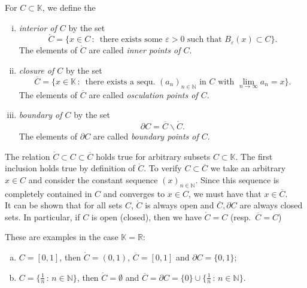 

\begin{Definition}
For $C\subset \mathbb{K}$, we define the
\begin{enumerate}[(i)]
 \item \emph{interior of $C$} by the set
\[\mathring{C}=\{x\in C\,:\,\text{ there exists some }\varepsilon>0\text{ such that }B_{\varepsilon}(x)\subset C\}.\]
The elements of $\mathring{C}$ are called \textit{inner points of $C$}.
 \item \emph{closure of $C$} by the set
   \[\overline{C}=\{x\in \mathbb{K}\,:\,\text{ there exists a sequ. }(a_n)_{n\in\mathbb{N}}\text{ in $C$ with }\lim_{n\to\infty}a_{n}=x\}.\]
The elements of $\overline{C}$ are called \emph{osculation points of $C$}.
 \item \emph{boundary of $C$} by the set
\[\partial C=\overline{C}\backslash \mathring{C}.\]
The elements of $\partial{C}$ are called \emph{boundary points of $C$}.
\end{enumerate}
\end{Definition}
\begin{Remark}{}
  The relation $\mathring{C}\subset C\subset \overline{C}$ holds true for arbitrary subsets $C\subset \mathbb{K}$. The first inclusion holds true by definition of $\mathring{C}$. To verify $C\subset \overline{C}$ we take an arbitrary $x\in C$ and consider the constant sequence $(x)_{n\in\mathbb{N}}$. Since this sequence is completely contained in $C$ and converges to $x\in C$, we must have that $x\in\overline{C}$.\\
It can be shown that for all sets $C$, $\mathring{C}$ is always open and $\overline{C}, \partial C$ are always closed sets. In particular, if $C$ is open (closed), then we have $\mathring{C}=C$ (resp.\ $\overline{C}=C$)
\end{Remark}

\begin{example}
These are examples in the case $\mathbb{K} = \mathbb{R}$:
\begin{enumerate}[(a)]
 \item $C=[0,1]$, then $\mathring{C}=(0,1)$, $\overline{C}=[0,1]$ and $\partial C=\{0,1\}$;
 \item $C=\{\frac1n\,:\,n\in\mathbb{N}\}$, then $\mathring{C}=\emptyset$ and $\overline{C}=\partial C=\{0\}\cup \{\frac1n\,:\,n\in\mathbb{N}\}$.
\end{enumerate}
\end{example}

